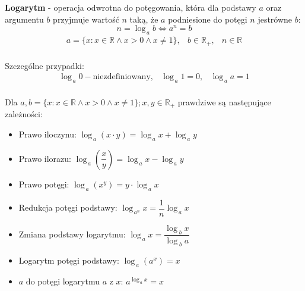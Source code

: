 \documentclass[14pt,a4paper]{extarticle}
\begin{document}
\renewcommand{\arraycolsep}{0.5cm}

\noindent\textbf{Logarytm} - operacja odwrotna do potęgowania, która dla podstawy $a$ oraz argumentu $b$ przyjmuje wartość $n$ taką, że $a$ podniesione do potęgi $n$ jest\linebreak równe $b$:
$$n = \log_{\,a}b \Leftrightarrow a^{n} = b$$
\begin{equation*}
\begin{array}{ccc}
   a=\{x:x\in\mathbb{R}\land x>0\land x\neq 1\}, & b \in \mathbb{R}_{+}, & n \in \mathbb{R} \\
\end{array}
\end{equation*}

\noindent Szczególne przypadki:
\begin{equation*}
\begin{array}{ccc}
   \log_{\,a}0 - \text{niezdefiniowany}, & \log_{\,a}1 = 0, & \log_{\,a}a = 1 \\
\end{array}
\end{equation*}

\renewcommand{\arraycolsep}{0.8cm}
\newpage
\noindent Dla $a, b =\{x:x\in\mathbb{R}\land x>0\land x\neq 1\}; x, y \in \mathbb{R}_{+}$ prawdziwe są następujące zależności:

\begin{itemize}
   \item Prawo iloczynu: $\log_{\,a}(x\cdot y) = \log_{\,a}x + \log_{\,a}y$
   \item Prawo ilorazu: $\log_{\,a}\left(\dfrac{x}{y}\right) = \log_{\,a}x - \log_{\,a}y$
   \item Prawo potęgi: $\log_{\,a}(x^{y}) = y\cdot\log_{\,a}x$
   \item Redukcja potęgi podstawy: $\log_{\,a^{n}}x = \dfrac{1}{n}\log_{\,a}x$
   \item Zmiana podstawy logarytmu: $\log_{\,a}x = \dfrac{\log_{\;b}x}{\log_{\;b}a}$
   \item Logarytm potęgi podstawy: $\log_{\,a}(a^{x}) = x$
   \item $a$ do potęgi logarytmu $a$ z $x$: $a^{\log_{\,a}x} = x$
\end{itemize}
\end{document}
